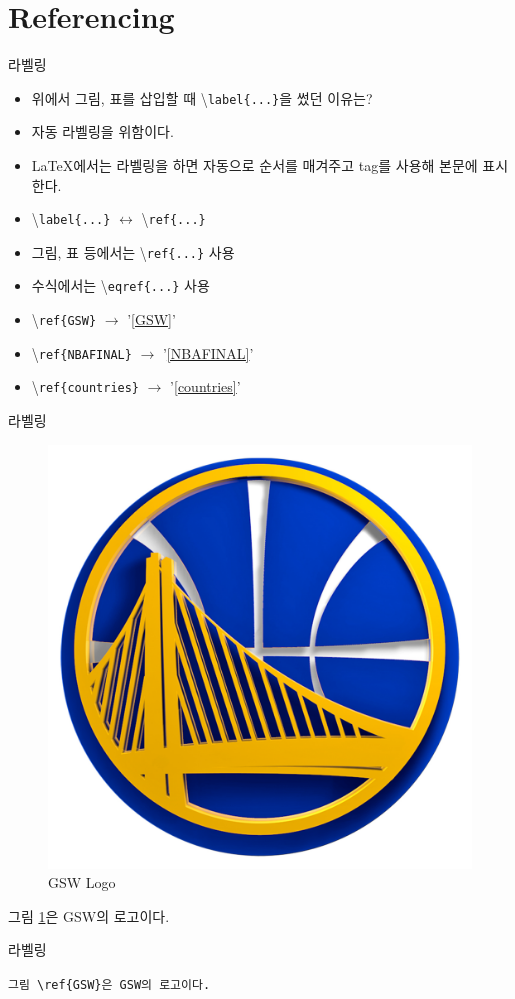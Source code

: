 \documentclass[12pt]{gshs_lecture}
\newenvironment{codeblock}[1]{
	\begin{block}{#1}
		\setstretch{1.0}
		\begin{small}
}{
		\end{small}
	\end{block}
}
\begin{document}
\section{Referencing}

\begin{frame}[t]{라벨링}
	
	\begin{itemize}
		\item 위에서 그림, 표를 삽입할 때 \textbackslash \texttt{label\{...\}}을 썼던 이유는?
		\item 자동 라벨링을 위함이다.
		\item \LaTeX 에서는 라벨링을 하면 자동으로 순서를 매겨주고 tag를 사용해 본문에 표시한다.
		\item \textbackslash \texttt{label\{...\}} $\leftrightarrow$ \textbackslash \texttt{ref\{...\}}
		\item 그림, 표 등에서는 \textbackslash \texttt{ref\{...\}} 사용
		\item 수식에서는 \textbackslash \texttt{eqref\{...\}} 사용
		\item \textbackslash \texttt{ref\{GSW\}} $\rightarrow$ '\ref{GSW}'
		\item \textbackslash \texttt{ref\{NBAFINAL\}} $\rightarrow$ '\ref{NBAFINAL}'
		\item \textbackslash \texttt{ref\{countries\}} $\rightarrow$ '\ref{countries}'
	\end{itemize}
	
\end{frame}

\begin{frame}[t]{라벨링}
	\begin{figure}[htbp]
		\centering
		\includegraphics[width=.2\textwidth]{./pictures/GSW_logo.jpg}
		\caption{GSW Logo}
		\label{GSW2}
	\end{figure}

	그림 \ref{GSW2}은 GSW의 로고이다.
	
	\vskip 1pc	
	
	\begin{codeblock}{라벨링}
		\texttt{그림 \textbackslash ref\{GSW\}은 GSW의 로고이다.}
	\end{codeblock}
	
\end{frame}
\end{document}
